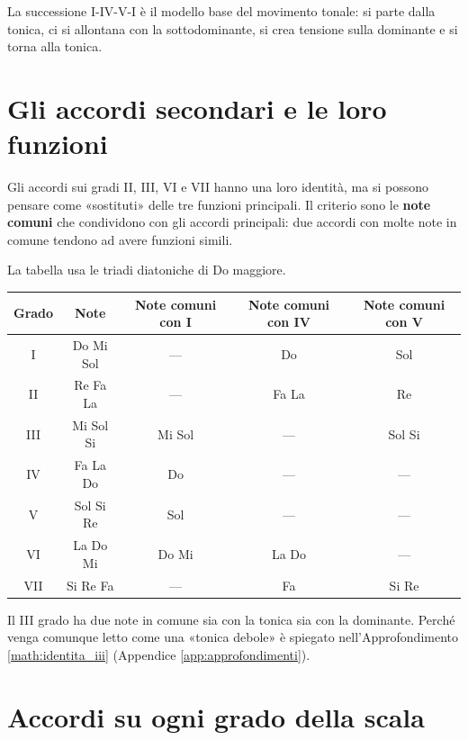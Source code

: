 La successione I-IV-V-I è il modello base del movimento tonale: si parte dalla tonica, ci si allontana con la sottodominante, si crea tensione sulla dominante e si torna alla tonica.

\section{Gli accordi secondari e le loro funzioni}
\label{sec:accordi_secondari}

Gli accordi sui gradi II, III, VI e VII hanno una loro identità, ma si possono pensare come «sostituti» delle tre funzioni principali. Il criterio sono le \textbf{note comuni} che condividono con gli accordi principali: due accordi con molte note in comune tendono ad avere funzioni simili.

\begin{esempio}
\end{esempio}

La tabella usa le triadi diatoniche di Do maggiore.

\begin{center}
\begin{tabular}{ccccc}
\toprule
\textbf{Grado} & \textbf{Note} & \textbf{Note comuni con I} & \textbf{Note comuni con IV} & \textbf{Note comuni con V} \\
\midrule
I & Do Mi Sol & --- & Do & Sol \\
II & Re Fa La & --- & Fa La & Re \\
III & Mi Sol Si & Mi Sol & --- & Sol Si \\
IV & Fa La Do & Do & --- & --- \\
V & Sol Si Re & Sol & --- & --- \\
VI & La Do Mi & Do Mi & La Do & --- \\
VII & Si Re Fa & --- & Fa & Si Re \\
\bottomrule
\end{tabular}
\end{center}

Il III grado ha due note in comune sia con la tonica sia con la dominante. Perché venga comunque letto come una «tonica debole» è spiegato nell'Approfondimento \ref{math:identita_iii} (Appendice \ref{app:approfondimenti}).

\section{Accordi su ogni grado della scala}
\label{subsec:accordi_funzioni}

